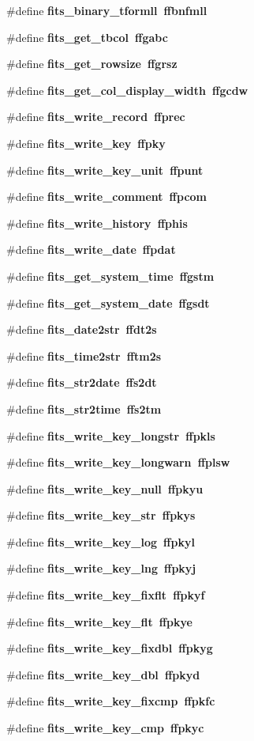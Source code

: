 \begin{CompactItemize}
\item 
\#define \bf{fits\_\-binary\_\-tformll}~ffbnfmll
\item 
\#define \bf{fits\_\-get\_\-tbcol}~ffgabc
\item 
\#define \bf{fits\_\-get\_\-rowsize}~ffgrsz
\item 
\#define \bf{fits\_\-get\_\-col\_\-display\_\-width}~ffgcdw
\item 
\#define \bf{fits\_\-write\_\-record}~ffprec
\item 
\#define \bf{fits\_\-write\_\-key}~ffpky
\item 
\#define \bf{fits\_\-write\_\-key\_\-unit}~ffpunt
\item 
\#define \bf{fits\_\-write\_\-comment}~ffpcom
\item 
\#define \bf{fits\_\-write\_\-history}~ffphis
\item 
\#define \bf{fits\_\-write\_\-date}~ffpdat
\item 
\#define \bf{fits\_\-get\_\-system\_\-time}~ffgstm
\item 
\#define \bf{fits\_\-get\_\-system\_\-date}~ffgsdt
\item 
\#define \bf{fits\_\-date2str}~ffdt2s
\item 
\#define \bf{fits\_\-time2str}~fftm2s
\item 
\#define \bf{fits\_\-str2date}~ffs2dt
\item 
\#define \bf{fits\_\-str2time}~ffs2tm
\item 
\#define \bf{fits\_\-write\_\-key\_\-longstr}~ffpkls
\item 
\#define \bf{fits\_\-write\_\-key\_\-longwarn}~ffplsw
\item 
\#define \bf{fits\_\-write\_\-key\_\-null}~ffpkyu
\item 
\#define \bf{fits\_\-write\_\-key\_\-str}~ffpkys
\item 
\#define \bf{fits\_\-write\_\-key\_\-log}~ffpkyl
\item 
\#define \bf{fits\_\-write\_\-key\_\-lng}~ffpkyj
\item 
\#define \bf{fits\_\-write\_\-key\_\-fixflt}~ffpkyf
\item 
\#define \bf{fits\_\-write\_\-key\_\-flt}~ffpkye
\item 
\#define \bf{fits\_\-write\_\-key\_\-fixdbl}~ffpkyg
\item 
\#define \bf{fits\_\-write\_\-key\_\-dbl}~ffpkyd
\item 
\#define \bf{fits\_\-write\_\-key\_\-fixcmp}~ffpkfc
\item 
\#define \bf{fits\_\-write\_\-key\_\-cmp}~ffpkyc

\end{CompactItemize}
